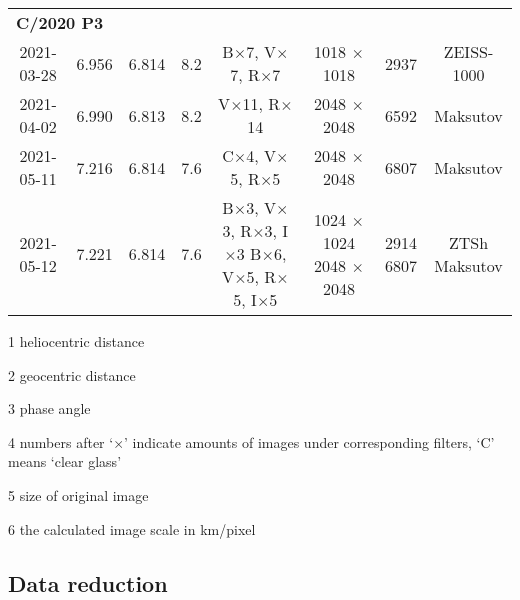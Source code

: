 \begin{table}[!htbp]
\begin{threeparttable}
{\begin{tabular}{cccccccc}
            \multicolumn{8}{l}{\textbf{C/2020 P3}} \\
            2021-03-28 & 6.956 & 6.814 & 8.2 & B$\times$7, V$\times$7, R$\times$7 & 1018 $\times$ 1018 & 2937 & ZEISS-1000 \\
            2021-04-02 & 6.990 & 6.813 & 8.2 & V$\times$11, R$\times$14 & 2048 $\times$ 2048 & 6592 & Maksutov \\
            2021-05-11 & 7.216 & 6.814 & 7.6 & C$\times$4, V$\times$5, R$\times$5 & 2048 $\times$ 2048 & 6807 & Maksutov \\
            2021-05-12 & 7.221 & 6.814 & 7.6 & \makecell[c]{B$\times$3, V$\times$3, R$\times$3, I$\times$3 \\ B$\times$6, V$\times$5, R$\times$5, I$\times$5} & \makecell[c]{1024 $\times$ 1024 \\ 2048 $\times$ 2048}  & \makecell[c]{2914 \\ 6807} & \makecell[c]{ZTSh \\ Maksutov} \\
            \bottomrule
        \end{tabular}
        }
        \begin{tablenotes}
            \item[1] heliocentric distance
            \item[2] geocentric distance
            \item[3] phase angle
            \item[4] numbers after `$\times$' indicate amounts of images under corresponding filters, `C' means `clear glass'
            \item[5] size of original image
            \item[6] the calculated image scale in \si{\km/pixel}
        \end{tablenotes}
    \end{threeparttable}
\end{table}
\DTMsetregional[text]

\subsection{Data reduction}

